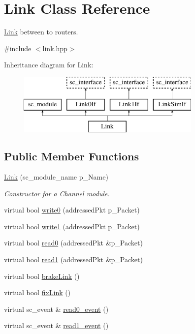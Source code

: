 \hypertarget{classLink}{\section{Link Class Reference}
\label{classLink}
}


\hyperlink{classLink}{Link} between to routers.  




{\ttfamily \#include $<$link.\-hpp$>$}

Inheritance diagram for Link\-:\begin{figure}[H]
\begin{center}
\leavevmode
\includegraphics[height=3.000000cm]{classLink}
\end{center}
\end{figure}
\subsection*{Public Member Functions}
\begin{DoxyCompactItemize}
\item 
\hypertarget{classLink_a6e071660c3218389183bc50e944aad75}{\hyperlink{classLink_a6e071660c3218389183bc50e944aad75}{Link} (sc\-\_\-module\-\_\-name p\-\_\-\-Name)}\label{classLink_a6e071660c3218389183bc50e944aad75}

\begin{DoxyCompactList}\small\item\em Constructor for a Channel module. \end{DoxyCompactList}\item 
virtual bool \hyperlink{classLink_a0903f9afe6c65ac518eb3f44aa565cff}{write0} (addressed\-Pkt p\-\_\-\-Packet)
\item 
virtual bool \hyperlink{classLink_ac28c9d60284a02196992ea063f375cd0}{write1} (addressed\-Pkt p\-\_\-\-Packet)
\item 
virtual bool \hyperlink{classLink_a3a56178230de2c4a8ca2409f6f1e55bb}{read0} (addressed\-Pkt \&p\-\_\-\-Packet)
\item 
virtual bool \hyperlink{classLink_ac6cb4a6569a46f21ff2b1c7e60c27e22}{read1} (addressed\-Pkt \&p\-\_\-\-Packet)
\item 
virtual bool \hyperlink{classLink_adde13066127564c38d314f37c1ccfdd4}{brake\-Link} ()
\item 
virtual bool \hyperlink{classLink_a01b360a20843d5efca09d70a6a328951}{fix\-Link} ()
\item 
virtual sc\-\_\-event \& \hyperlink{classLink_a32184a40c508f744fb7f2f9c3b7211e8}{read0\-\_\-event} ()
\item 
virtual sc\-\_\-event \& \hyperlink{classLink_a87842ba06901c709fa7b2460fdf29041}{read1\-\_\-event} ()
\end{DoxyCompactItemize}
